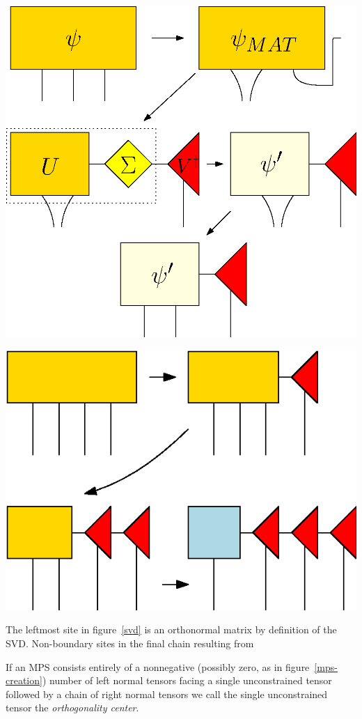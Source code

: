 \documentclass[12pt]{article}
\newenvironment{Figure}
  {\par\medskip\noindent\minipage{\linewidth}}
  {\endminipage\par\medskip}
\begin{document}
\begin{multicols}{2}
	\begin{Figure}
		\center\includegraphics[width=.7\textwidth]{./Figures/svd.eps}
		\label{svd}
	\end{Figure}

	\begin{Figure}
		\center\includegraphics[width=.7\textwidth]{./Figures/mps-creation.eps}
		\label{mps-creation}
	\end{Figure}

	The leftmost site
	in figure~\ref{svd} is an orthonormal matrix by definition of the
	SVD. Non-boundary sites in the final chain resulting from

	If an MPS consists entirely of a nonnegative (possibly zero, as in
	figure~\ref{mps-creation}) number of left normal tensors facing a
	single unconstrained tensor followed by a chain of right normal
	tensors we call the single unconstrained tensor the
	\textit{orthogonality center}.



\end{multicols}
\end{document}
